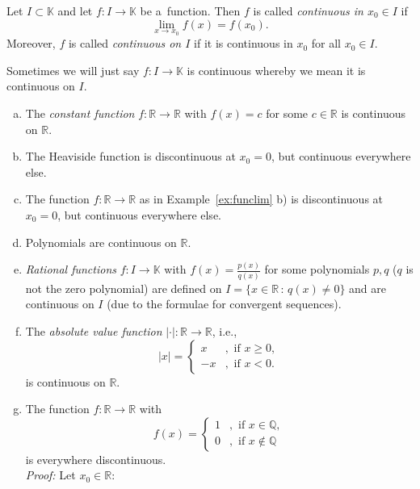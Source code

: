 

\begin{Definition}[Continuity]
Let $I\subset\mathbb{K}$ and let $f:I\to\mathbb{K}$ be a~function. Then $f$ is called \emph{ continuous in $x_0\in I$} if
\[\lim_{x\to x_0}f(x)=f(x_0).\]
Moreover, $f$ is called \emph{continuous on $I$} if it is continuous in $x_0$ for all $x_0\in I$.
\end{Definition}
\begin{Remark}{}
Sometimes we will just say $f:I\to\mathbb{K}$ is continuous whereby we mean it is continuous on $I$.
\end{Remark}

\begin{example}
\begin{enumerate}[a)]
 \item The {\em constant function} $f:\mathbb{R}\to\mathbb{R}$ with $f(x)=c$ for some $c\in\mathbb{R}$ is continuous on $\mathbb{R}$.
 \whiteskipsmall
 \item The Heaviside function is discontinuous at $x_0=0$, but continuous everywhere else.
  \whiteskipsmall
 \item The function $f:\mathbb{R}\to\mathbb{R}$ as in Example~\ref{ex:funclim} b) is discontinuous at $x_0=0$, but continuous everywhere else.
  \whiteskipsmall
 \item Polynomials are continuous on $\mathbb{R}$.
   \whiteskipsmall
 \item {\em Rational functions} $f:I\to\mathbb{K}$ with $f(x)=\frac{p(x)}{q(x)}$ for some polynomials $p,q$ ($q$ is not the zero polynomial) are defined on $I=\{x\in\mathbb{R}\,:\,q(x)\neq0\}$ and are continuous
on $I$ (due to the formulae for convergent sequences).
	 \whiteskipsmall
 \item The {\em absolute value function} $|\cdot|:\mathbb{R}\to\mathbb{R}$, i.e.,
\[|x|=\begin{cases}x&,\text{ if }x\geq 0,\\-x&,\text{ if }x<0.\end{cases}\]
 is continuous on $\mathbb{R}$.
 	  \whiteskipsmall
 \item The function $f:\mathbb{R}\to\mathbb{R}$ with
\[f(x)=\begin{cases}1&,\text{ if }x\in\mathbb{Q},\\0&,\text{ if }x\notin\mathbb{Q}\end{cases}\]
 is everywhere discontinuous.\\
       \whiteskipsmall
{\em Proof:} Let $x_0\in\mathbb{R}$:\\

\end{enumerate}
\end{example}
